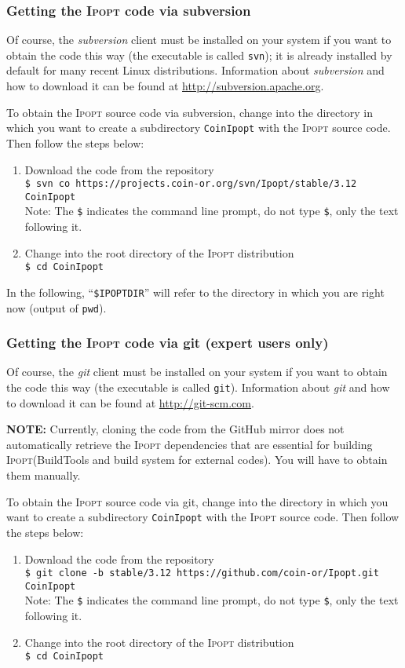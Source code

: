 \documentclass[10pt]{article}
\newcommand{\Ipopt}{\textsc{Ipopt}\xspace}
\begin{document}
\subsubsection{Getting the \Ipopt code via subversion}

Of course, the \textit{subversion} client must be installed on your
system if you want to obtain the code this way (the executable is
called \texttt{svn}); it is already installed by default for many
recent Linux distributions.  Information about \textit{subversion} and
how to download it can be found at
\url{http://subversion.apache.org}.

To obtain the \Ipopt source code via subversion, change into the
directory in which you want to create a subdirectory {\tt CoinIpopt} with
the \Ipopt source code.  Then follow the steps below:
\begin{enumerate}
\item{Download the code from the repository}\\
{\tt \$ svn co https://projects.coin-or.org/svn/Ipopt/stable/3.12 CoinIpopt} \\
Note: The {\tt \$} indicates the command line
prompt, do not type {\tt \$}, only the text following it.
\item Change into the root directory of the \Ipopt distribution\\
{\tt \$ cd CoinIpopt}
\end{enumerate}

In the following, ``\texttt{\$IPOPTDIR}'' will refer to the directory in
which you are right now (output of \texttt{pwd}).

\subsubsection{Getting the \Ipopt code via git (expert users only)}

Of course, the \textit{git} client must be installed on your
system if you want to obtain the code this way (the executable is
called \texttt{git}).  Information about \textit{git} and
how to download it can be found at
\url{http://git-scm.com}.

\textbf{NOTE:} Currently, cloning the code from the GitHub mirror does
not automatically retrieve the \Ipopt dependencies that are essential
for building \Ipopt (BuildTools and build system for external codes).
You will have to obtain them manually.

To obtain the \Ipopt source code via git, change into the
directory in which you want to create a subdirectory {\tt CoinIpopt} with
the \Ipopt source code.  Then follow the steps below:
\begin{enumerate}
\item{Download the code from the repository}\\
{\tt \$ git clone -b stable/3.12 https://github.com/coin-or/Ipopt.git CoinIpopt} \\
Note: The {\tt \$} indicates the command line
prompt, do not type {\tt \$}, only the text following it.
\item Change into the root directory of the \Ipopt distribution\\
{\tt \$ cd CoinIpopt}
\end{enumerate}
\end{document}
